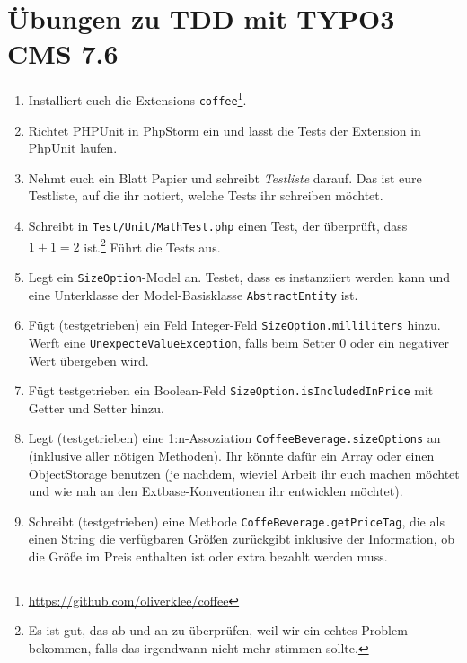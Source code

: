 \documentclass[a4paper,12pt]{scrartcl}
\begin{document}
\raggedbottom

\section*{Übungen zu TDD mit TYPO3 CMS 7.6}

\begin{enumerate}
  \item Installiert euch die Extensions \texttt{coffee}\footnote{\url{https://github.com/oliverklee/coffee}}.

  \item Richtet PHPUnit in PhpStorm ein und lasst die Tests der Extension in PhpUnit laufen.

  \item Nehmt euch ein Blatt Papier und schreibt \emph{Testliste} darauf. Das ist eure Testliste, auf die ihr notiert, welche Tests ihr schreiben möchtet.

  \item Schreibt in \texttt{Test/Unit/MathTest.php} einen Test, der überprüft, dass $1 + 1 = 2$ ist.\footnote{Es ist gut, das ab und an zu überprüfen, weil wir ein echtes Problem bekommen, falls das irgendwann nicht mehr stimmen sollte.} Führt die Tests aus.

  \item Legt ein \texttt{SizeOption}-Model an. Testet, dass es instanziiert werden kann und eine Unterklasse der Model-Basisklasse \texttt{AbstractEntity} ist.

  \item Fügt (testgetrieben) ein Feld Integer-Feld \texttt{SizeOption.milliliters}  hinzu. Werft eine \texttt{UnexpecteValueException}, falls beim Setter 0 oder ein negativer Wert übergeben wird.

  \item Fügt testgetrieben ein Boolean-Feld \texttt{SizeOption.isIncludedInPrice} mit Getter und Setter hinzu.

  \item Legt (testgetrieben) eine 1:n-Assoziation \texttt{CoffeeBeverage.sizeOptions} an (inklusive aller nötigen Methoden). Ihr könnte dafür ein Array oder einen ObjectStorage benutzen (je nachdem, wieviel Arbeit ihr euch machen möchtet und wie nah an den Extbase-Konventionen ihr entwicklen möchtet).

  \item Schreibt (testgetrieben) eine Methode \texttt{CoffeBeverage.getPriceTag}, die als einen String die verfügbaren Größen zurückgibt inklusive der Information, ob die Größe im Preis enthalten ist oder extra bezahlt werden muss.


\end{enumerate}
\end{document}
